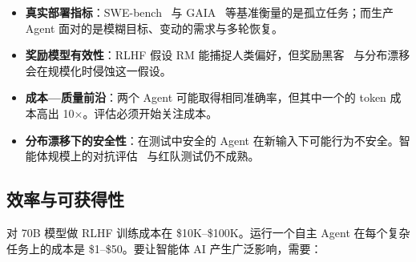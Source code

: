\begin{itemize}
  \item \textbf{真实部署指标}：SWE-bench~\cite{jimenez2024swebench} 与 GAIA~\cite{mialon2023gaia} 等基准衡量的是孤立任务；而生产 Agent 面对的是模糊目标、变动的需求与多轮恢复。
  \item \textbf{奖励模型有效性}：RLHF 假设 RM 能捕捉人类偏好，但奖励黑客~\cite{skalse2022defining} 与分布漂移会在规模化时侵蚀这一假设。
  \item \textbf{成本—质量前沿}：两个 Agent 可能取得相同准确率，但其中一个的 token 成本高出 10$\times$。评估必须开始关注成本。
  \item \textbf{分布漂移下的安全性}：在测试中安全的 Agent 在新输入下可能行为不安全。智能体规模上的对抗评估~\cite{perez2022red} 与红队测试仍不成熟。
\end{itemize}

\subsection{效率与可获得性}
\label{efficiency-and-accessibility}

对 70B 模型做 RLHF 训练成本在 \$10K--\$100K。运行一个自主 Agent 在每个复杂任务上的成本是 \$1--\$50。要让智能体 AI 产生广泛影响，需要：

